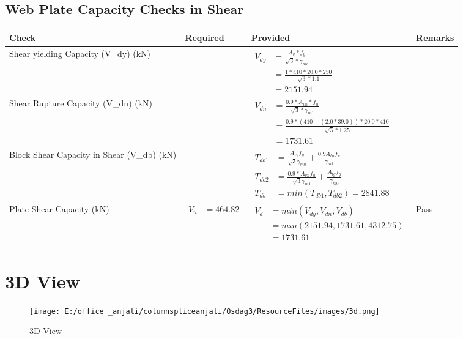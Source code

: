 \documentclass{article}%
\begin{document}
\subsection{Web Plate Capacity Checks in Shear}%
\label{subsec:WebPlateCapacityChecksinShear}%
\renewcommand{\arraystretch}{1.2}%
\begin{longtable}{|p{4cm}|p{6cm}|p{5.5cm}|p{1.5cm}|}%
\hline%
\rowcolor{OsdagGreen}%
Check&Required&Provided&Remarks\\%
\hline%
\endhead%
\hline%
Shear yielding Capacity (V\_dy) (kN)&&$\begin{aligned} V_{dy} &= \frac{A_v*f_y}{\sqrt{3}*\gamma_{mo}}\\ &=\frac{1*410*20.0*250}{\sqrt{3}*1.1}\\ &=2151.94\end{aligned}$&\\%
\hline%
Shear Rupture Capacity (V\_dn) (kN)&&$\begin{aligned} V_{dn} &= \frac{0.9*A_{vn}*f_u}{\sqrt{3}*\gamma_{m1}}\\ &= \frac{0.9 *(410-(2.0*39.0))*20.0*410}{\sqrt{3}*1.25}\\ &=1731.61\end{aligned}$&\\%
\hline%
Block Shear Capacity in Shear (V\_db) (kN)&&$\begin{aligned}T_{db1} &= \frac{A_{vg} f_{y}}{\sqrt{3} \gamma_{m0}} + \frac{0.9 A_{tn} f_{u}}{\gamma_{m1}}\\ T_{db2} &= \frac{0.9*A_{vn} f_{u}}{\sqrt{3} \gamma_{m1}} + \frac{A_{tg} f_{y}}{\gamma_{m0}}\\ T_{db} &= min(T_{db1}, T_{db2})= 2841.88\end{aligned}$&\\%
\hline%
Plate Shear Capacity (kN)&$\begin{aligned} V_u &=464.82\end{aligned}$&$\begin{aligned} V_d &= min(V_{dy},V_{dn},V_{db})\\ &= min(2151.94,1731.61,4312.75)\\ &=1731.61\end{aligned}$&Pass\\%
\hline%
\end{longtable}

%
%
\newpage%
\section{3D View}%
\label{sec:3DView}%


\begin{figure}[h!]%
\centering%
\texttt{[image: E:/office \_anjali/columnspliceanjali/Osdag3/ResourceFiles/images/3d.png]}%
\caption{3D View}%
\end{figure}

%
\end{document}
